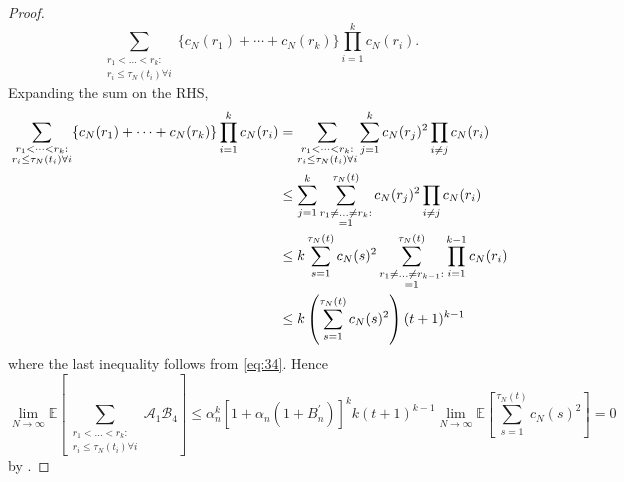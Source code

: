 \documentclass{article}
\newcommand{\E}{\mathbb{E}}
\newcommand{\1}[1]{\mathbbm{1}_{#1}}
\begin{document}
\begin{proof}
\begin{equation}
\sum_{\substack{r_1 <\dots< r_k :\\ r_i \leq \tau_N(t_i) \forall i}}
\{ c_N(r_1) + \cdots + c_N(r_k) \}
\prod_{i=1}^k  c_N(r_i) .
\end{equation}
Expanding the sum on the RHS,
\begin{align}
\sum_{\substack{r_1 <\dots< r_k :\\ r_i \leq \tau_N(t_i) \forall i}}
\{ c_N(r_1) + \cdots + c_N(r_k) \}
\prod_{i=1}^k  c_N(r_i)
&= \sum_{\substack{r_1 <\dots< r_k :\\ r_i \leq \tau_N(t_i) \forall i}}
\sum_{j=1}^k c_N(r_j)^2 \prod_{i\neq j} c_N(r_i) \notag\\
&\leq \sum_{j=1}^k \sum_{\substack{r_1 \neq \dots \neq r_k :\\ =1}}^{\tau_N(t)} c_N(r_j)^2 \prod_{i\neq j} c_N(r_i) \notag\\
&\leq k \sum_{s=1}^{\tau_N(t)} c_N(s)^2
\sum_{\substack{r_1 \neq \dots \neq r_{k-1} :\\ =1}}^{\tau_N(t)} \prod_{i=1}^{k-1} c_N(r_i) \notag\\
&\leq k \left( \sum_{s=1}^{\tau_N(t)} c_N(s)^2 \right) (t+1)^{k-1}
\end{align}
where the last inequality follows from \eqref{eq:34}.
Hence
\begin{equation}
\lim_{N\to\infty}\E\left[ \sum_{\substack{r_1 <\dots< r_k :\\ r_i \leq \tau_N(t_i) \forall i}} \mathscr{A}_1 \mathscr{B}_4 \right]
\leq \alpha_n^k \left[ 1 + \alpha_n (1 + B_n^\prime) \right]^k
k (t+1)^{k-1} \lim_{N\to\infty}\E\left[ \sum_{s=1}^{\tau_N(t)} c_N(s)^2 \right] =0
\end{equation}
by \citet[Equation (3.4)]{brown2021}.


\end{proof}
\end{document}
